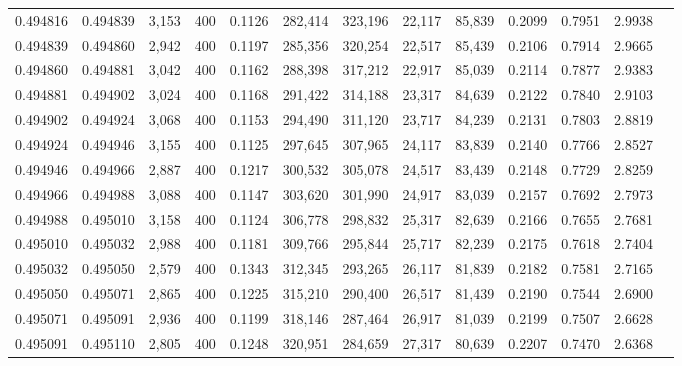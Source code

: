 \begin{tabular}{rrrrrrrrrrrrr}
0.494816 & 0.494839 &  3,153 & 400 &                                     0.1126 & 282,414 & 323,196 &  22,117 &  85,839 & 0.2099 & 0.7951 & 2.9938 \\
0.494839 & 0.494860 &  2,942 & 400 &                                     0.1197 & 285,356 & 320,254 &  22,517 &  85,439 & 0.2106 & 0.7914 & 2.9665 \\
0.494860 & 0.494881 &  3,042 & 400 &                                     0.1162 & 288,398 & 317,212 &  22,917 &  85,039 & 0.2114 & 0.7877 & 2.9383 \\
0.494881 & 0.494902 &  3,024 & 400 &                                     0.1168 & 291,422 & 314,188 &  23,317 &  84,639 & 0.2122 & 0.7840 & 2.9103 \\
0.494902 & 0.494924 &  3,068 & 400 &                                     0.1153 & 294,490 & 311,120 &  23,717 &  84,239 & 0.2131 & 0.7803 & 2.8819 \\
0.494924 & 0.494946 &  3,155 & 400 &                                     0.1125 & 297,645 & 307,965 &  24,117 &  83,839 & 0.2140 & 0.7766 & 2.8527 \\
0.494946 & 0.494966 &  2,887 & 400 &                                     0.1217 & 300,532 & 305,078 &  24,517 &  83,439 & 0.2148 & 0.7729 & 2.8259 \\
0.494966 & 0.494988 &  3,088 & 400 &                                     0.1147 & 303,620 & 301,990 &  24,917 &  83,039 & 0.2157 & 0.7692 & 2.7973 \\
0.494988 & 0.495010 &  3,158 & 400 &                                     0.1124 & 306,778 & 298,832 &  25,317 &  82,639 & 0.2166 & 0.7655 & 2.7681 \\
0.495010 & 0.495032 &  2,988 & 400 &                                     0.1181 & 309,766 & 295,844 &  25,717 &  82,239 & 0.2175 & 0.7618 & 2.7404 \\
0.495032 & 0.495050 &  2,579 & 400 &                                     0.1343 & 312,345 & 293,265 &  26,117 &  81,839 & 0.2182 & 0.7581 & 2.7165 \\
0.495050 & 0.495071 &  2,865 & 400 &                                     0.1225 & 315,210 & 290,400 &  26,517 &  81,439 & 0.2190 & 0.7544 & 2.6900 \\
0.495071 & 0.495091 &  2,936 & 400 &                                     0.1199 & 318,146 & 287,464 &  26,917 &  81,039 & 0.2199 & 0.7507 & 2.6628 \\
0.495091 & 0.495110 &  2,805 & 400 &                                     0.1248 & 320,951 & 284,659 &  27,317 &  80,639 & 0.2207 & 0.7470 & 2.6368 \\

\end{tabular}
